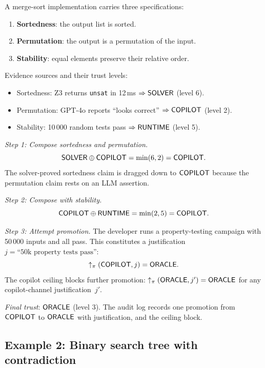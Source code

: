 \documentclass[11pt]{article}
\begin{document}
\begin{example}\label{ex:mergesort}
A merge-sort implementation carries three specifications:
\begin{enumerate}[nosep]
  \item \textbf{Sortedness}: the output list is sorted.
  \item \textbf{Permutation}: the output is a permutation of the input.
  \item \textbf{Stability}: equal elements preserve their
        relative order.
\end{enumerate}
Evidence sources and their trust levels:
\begin{itemize}[nosep]
  \item Sortedness: Z3 returns \texttt{unsat} in 12\,ms
        $\Rightarrow \mathsf{SOLVER}$ (level 6).
  \item Permutation: GPT-4o reports ``looks correct''
        $\Rightarrow \mathsf{COPILOT}$ (level 2).
  \item Stability: 10\,000 random tests pass
        $\Rightarrow \mathsf{RUNTIME}$ (level 5).
\end{itemize}

\emph{Step 1: Compose sortedness and permutation.}
\[
  \mathsf{SOLVER} \oplus \mathsf{COPILOT} = \min(6, 2) = \mathsf{COPILOT}.
\]
The solver-proved sortedness claim is dragged down to
$\mathsf{COPILOT}$ because the permutation claim rests on an
LLM assertion.

\emph{Step 2: Compose with stability.}
\[
  \mathsf{COPILOT} \oplus \mathsf{RUNTIME} = \min(2, 5) = \mathsf{COPILOT}.
\]

\emph{Step 3: Attempt promotion.}
The developer runs a property-testing campaign with 50\,000
inputs and all pass.  This constitutes a justification
$j = \text{``50k property tests pass''}$:
\[
  \uparrow_\pi(\mathsf{COPILOT}, j) = \mathsf{ORACLE}.
\]
The copilot ceiling blocks further promotion:
$\uparrow_\pi(\mathsf{ORACLE}, j') = \mathsf{ORACLE}$ for any copilot-channel
justification~$j'$.

\emph{Final trust}: $\mathsf{ORACLE}$ (level 3).
The audit log records one promotion from $\mathsf{COPILOT}$ to
$\mathsf{ORACLE}$ with justification, and the ceiling block.
\end{example}

\subsection{Example 2: Binary search tree with contradiction}
\label{sec:ex-bst}
\end{document}
